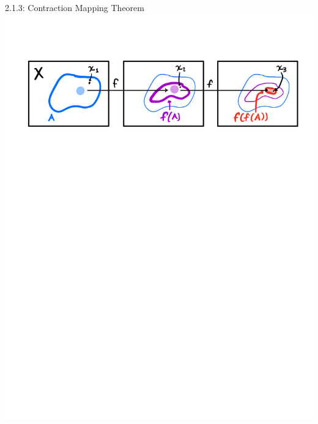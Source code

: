 \documentclass[10pt,english,aspectratio=169]{beamer}
\begin{document}
\begin{frame}{2.1.3: Contraction Mapping Theorem}
  \includegraphics[width=\textwidth]{figures/ch2_contraction_mapping}

\end{frame}
\end{document}

